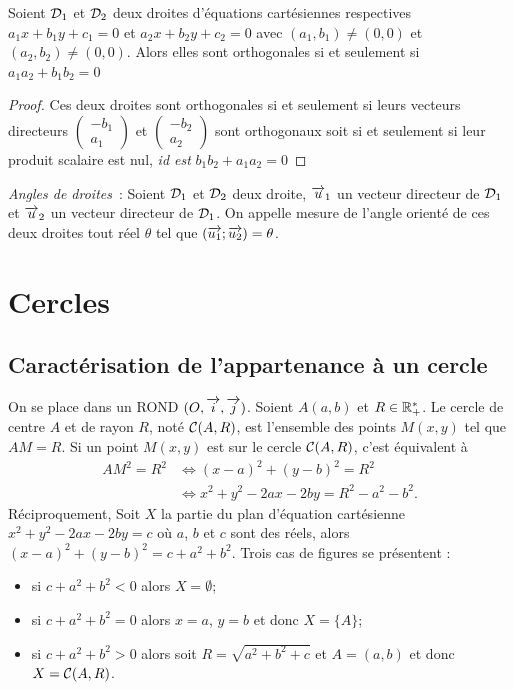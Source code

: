 \begin{prop}
  Soient \(\mathcal{D}_1\) et \(\mathcal{D}_2\) deux droites d'équations cartésiennes
  respectives \(a_1x + b_1y + c_1 = 0\) et \(a_2x + b_2y + c_2 = 0\) avec
  \((a_1 , b_1) \neq (0 , 0)\) et \((a_2 , b_2) \neq (0 , 0)\). Alors elles
  sont orthogonales si et seulement si \(a_1 a_2 + b_1 b_2 = 0\)
\end{prop}

\begin{proof}
  Ces deux droites sont orthogonales si et seulement si leurs vecteurs
  directeurs \(\begin{pmatrix} -b_1 \\ a_1 \end{pmatrix}\) et
  \(\begin{pmatrix} -b_2 \\ a_2 \end{pmatrix}\) sont orthogonaux soit si et
  seulement si leur produit scalaire est nul, \emph{id est} \(b_1 b_2 + a_1
  a_2 = 0\)
\end{proof}

\emph{Angles de droites}~:
Soient \(\mathcal{D}_1\) et \(\mathcal{D}_2\) deux droite, \(\overrightarrow{u}_1\) un vecteur directeur de
\(\mathcal{D}_1\) et \(\overrightarrow{u}_2\) un vecteur directeur de \(\mathcal{D}_1\). On appelle mesure de
l'angle orienté de ces deux droites tout réel \(\theta\) tel que
\((\overrightarrow{u_1};\overrightarrow{u_2}) = \theta\).

\section{Cercles}
\label{sec:cercle}

\subsection{Caractérisation de l'appartenance à un cercle}
\label{sec:caractcercle}

On se place dans un ROND \((O , \overrightarrow{i} , \overrightarrow{j})\). Soient \(A(a , b)\) et \(R \in
\mathbb{R}_{+}^{*}\). Le cercle de centre \(A\) et de rayon \(R\), noté
\(\mathcal{C}(A,R)\), est l'ensemble des points \(M(x , y)\) tel que \(AM = R\).
Si un point \(M(x , y)\) est sur le cercle \(\mathcal{C}(A,R)\), c'est équivalent
à
\begin{align}
  AM^2 = R^2 & \iff (x - a)^2 + (y - b)^2 = R^2\\
             &\iff x^2 + y^2 - 2ax - 2by = R^2 - a^2 - b^2.
\end{align}
Réciproquement, Soit \(X\) la partie du plan d'équation cartésienne \(x^2 +
y^2 - 2ax - 2by = c\) où \(a\), \(b\) et \(c\) sont des réels, alors \((x -
a)^2 + (y - b)^2 = c + a^2 + b^2\). Trois cas de figures se présentent :
\begin{itemize}
  \item si \(c + a^2 + b^2<0\) alors \(X = \emptyset\);
  \item si \(c + a^2 + b^2 = 0\) alors \(x = a\), \(y = b\) et donc \(X =
    \{A\}\);
  \item si \(c + a^2 + b^2>0\) alors soit \(R = \sqrt{a^2 + b^2 + c}\) et \(A
    = (a , b)\) et donc \(X = \mathcal{C}(A,R)\).
\end{itemize}

